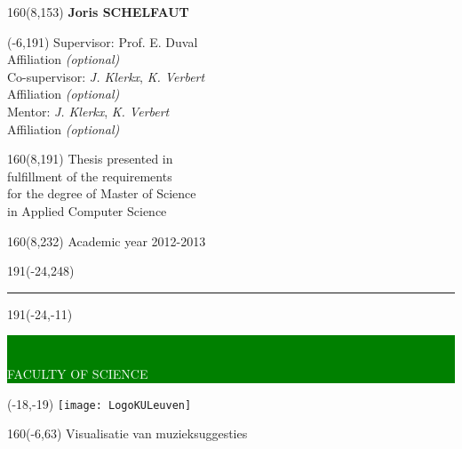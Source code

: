 \documentclass[12pt,a4paper,oneside]{book}
\begin{document}
\begin{textblock}{160}(8,153)
\textblockcolour{}
\vspace{-\parskip}
\flushright
\fontsize{14}{16}\selectfont \textbf{Joris SCHELFAUT}
\end{textblock}
%
\begin{textblock}{70}(-6,191)
\textblockcolour{}
\vspace{-\parskip}
\flushleft
Supervisor: Prof. E. Duval\\[-2pt]
\textcolor{blueaff}{Affiliation \textsl{(optional)}}\\[5pt]
Co-supervisor: \textsl{J. Klerkx}, \textsl{K. Verbert}\\[-2pt]
\textcolor{blueaff}{Affiliation \textsl{(optional)}}\\[5pt]
Mentor: \textsl{J. Klerkx}, \textsl{K. Verbert}\\[-2pt]
\textcolor{blueaff}{Affiliation \textsl{(optional)}}\\
\end{textblock}
%
\begin{textblock}{160}(8,191)
\textblockcolour{}
\vspace{-\parskip}
\flushright
Thesis presented in\\[4.5pt]
fulfillment of the requirements\\[4.5pt]
for the degree of Master of Science\\[4.5pt]
in Applied Computer Science\\
\end{textblock}
%
\begin{textblock}{160}(8,232)
\textblockcolour{}
\vspace{-\parskip}
\flushright
Academic year 2012-2013
\end{textblock}
%
\begin{textblock}{191}(-24,248)
{\color{blueline}\rule{550pt}{5.5pt}}
\end{textblock}
%
\vfill
\newpage


\thispagestyle{empty}
\newcommand{\form}[1]{\scalebox{1.087}{\boldmath{#1}}}
\sffamily
%
\begin{textblock}{191}(-24,-11)
	\colorbox{green}{\hspace{139mm}\ \parbox[c][18truemm]{52mm}{\textcolor{white}{FACULTY OF SCIENCE}}}
\end{textblock}
%
\begin{textblock}{70}(-18,-19)
	\textblockcolour{}
	\texttt{[image: LogoKULeuven]}
\end{textblock}
%
\begin{textblock}{160}(-6,63)
	\textblockcolour{}
	\vspace{-\parskip}
	\flushleft
	\fontsize{40}{42}\selectfont \textcolor{bluetitle}{Visualisatie van muzieksuggesties}\\[1.5mm]
	\fontsize{20}{22}\selectfont {A visueel uitlegsysteem voor collaboratieve filtering}
\end{textblock}
\end{document}
